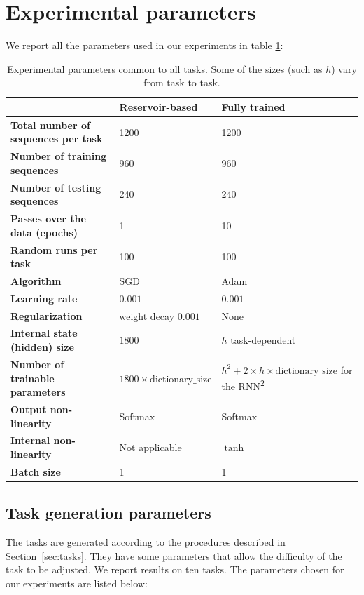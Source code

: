 \section{Experimental parameters}
\label{sec:parameters}
We report all the parameters used in our experiments in table \ref{tab:appendix-params}:
\begin{table}[htbp]
  \centering
  \begin{tabular}{p{.38\linewidth}p{.2\linewidth}p{.32\linewidth}}
    \toprule
    & \bfseries Reservoir-based & \bfseries Fully trained \\
    \midrule
    \bfseries Total number of sequences per task & 1200 & 1200 \\
    \bfseries Number of training sequences & 960 & 960 \\
    \bfseries Number of testing sequences & 240 & 240 \\
    \bfseries Passes over the data (epochs) & 1 & 10 \\
    \bfseries Random runs per task & 100 & 100\\
    \bfseries Algorithm & SGD & Adam \parencite{kingmaAdamMethodStochastic2015}\\
    \bfseries Learning rate & $0.001$ & $0.001$ \\
    \bfseries Regularization & weight decay $0.001$ & None \\
    \bfseries Internal state (hidden) size & $1800$ & $h$ task-dependent \\
    \bfseries Number of trainable parameters & $1800 \times \text{dictionary\_size}$ &
      $h^{2} + 2 \times h \times \text{dictionary\_size}$ for the RNN\textsuperscript{2}\\
    \bfseries Output non-linearity & Softmax & Softmax \\
    \bfseries Internal non-linearity & Not applicable & $\tanh$ \\
    \bfseries Batch size  & 1 & 1 \\
    \bottomrule
  \end{tabular}
  \caption{Experimental parameters common to all tasks. Some of the sizes (such
    as $h$) vary from task to task.}
  \label{tab:appendix-params}
\end{table}

\subsection{Task generation parameters\label{sec:task-gen-params}}
The tasks are generated according to the procedures described in
Section~\ref{sec:tasks}. They have some parameters that allow the
difficulty of the task to be adjusted. We report results on ten tasks. The parameters
chosen for our experiments are listed below:

